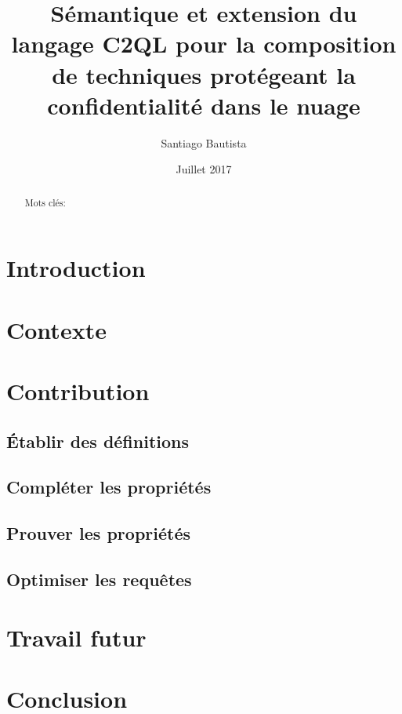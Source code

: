 \documentclass[a4paper,11pt]{article}
\author{Santiago Bautista}
\date{Juillet 2017}
\title{Sémantique et extension du langage C2QL pour la composition de techniques protégeant la confidentialité dans le nuage}
\begin{document}
\maketitle

\begin{abstract}
	
	\begin{description}
		\item[Mots clés:]{} 
	\end{description} 
	
\end{abstract}

\tableofcontents

\section{Introduction}


\section{Contexte}


\section{Contribution}


\subsection{Établir des définitions}


\subsection{Compléter les propriétés}


\subsection{Prouver les propriétés}


\subsection{Optimiser les requêtes}


\section{Travail futur}


\section{Conclusion}


 \newpage
 \appendix
\end{document}
